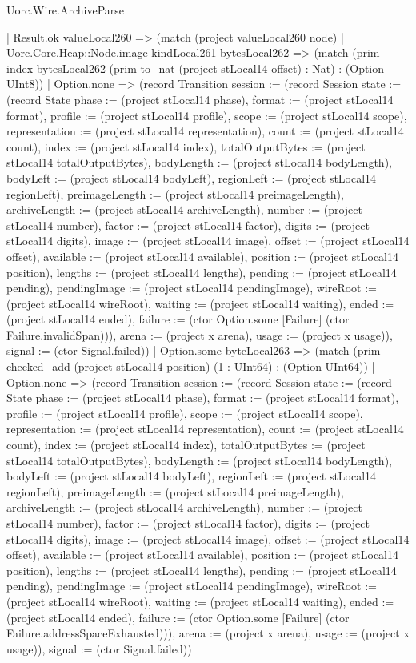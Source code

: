 \begin{lexlean}{Uorc.Wire.ArchiveParse}
\begin{semanticmodule}
{          | Result.ok valueLocal260 => (match (project valueLocal260 node)
            | Uorc.Core.Heap::Node.image kindLocal261 bytesLocal262 => (match (prim index bytesLocal262 (prim to_nat (project stLocal14 offset) : Nat) : (Option UInt8))
              | Option.none => (record Transition {session := (record Session {state := (record State {phase := (project stLocal14 phase), format := (project stLocal14 format), profile := (project stLocal14 profile), scope := (project stLocal14 scope), representation := (project stLocal14 representation), count := (project stLocal14 count), index := (project stLocal14 index), totalOutputBytes := (project stLocal14 totalOutputBytes), bodyLength := (project stLocal14 bodyLength), bodyLeft := (project stLocal14 bodyLeft), regionLeft := (project stLocal14 regionLeft), preimageLength := (project stLocal14 preimageLength), archiveLength := (project stLocal14 archiveLength), number := (project stLocal14 number), factor := (project stLocal14 factor), digits := (project stLocal14 digits), image := (project stLocal14 image), offset := (project stLocal14 offset), available := (project stLocal14 available), position := (project stLocal14 position), lengths := (project stLocal14 lengths), pending := (project stLocal14 pending), pendingImage := (project stLocal14 pendingImage), wireRoot := (project stLocal14 wireRoot), waiting := (project stLocal14 waiting), ended := (project stLocal14 ended), failure := (ctor Option.some [Failure] (ctor Failure.invalidSpan))}), arena := (project x arena), usage := (project x usage)}), signal := (ctor Signal.failed)})
              | Option.some byteLocal263 => (match (prim checked_add (project stLocal14 position) (1 : UInt64) : (Option UInt64))
                | Option.none => (record Transition {session := (record Session {state := (record State {phase := (project stLocal14 phase), format := (project stLocal14 format), profile := (project stLocal14 profile), scope := (project stLocal14 scope), representation := (project stLocal14 representation), count := (project stLocal14 count), index := (project stLocal14 index), totalOutputBytes := (project stLocal14 totalOutputBytes), bodyLength := (project stLocal14 bodyLength), bodyLeft := (project stLocal14 bodyLeft), regionLeft := (project stLocal14 regionLeft), preimageLength := (project stLocal14 preimageLength), archiveLength := (project stLocal14 archiveLength), number := (project stLocal14 number), factor := (project stLocal14 factor), digits := (project stLocal14 digits), image := (project stLocal14 image), offset := (project stLocal14 offset), available := (project stLocal14 available), position := (project stLocal14 position), lengths := (project stLocal14 lengths), pending := (project stLocal14 pending), pendingImage := (project stLocal14 pendingImage), wireRoot := (project stLocal14 wireRoot), waiting := (project stLocal14 waiting), ended := (project stLocal14 ended), failure := (ctor Option.some [Failure] (ctor Failure.addressSpaceExhausted))}), arena := (project x arena), usage := (project x usage)}), signal := (ctor Signal.failed)})
}
\end{semanticmodule}
\end{lexlean}
